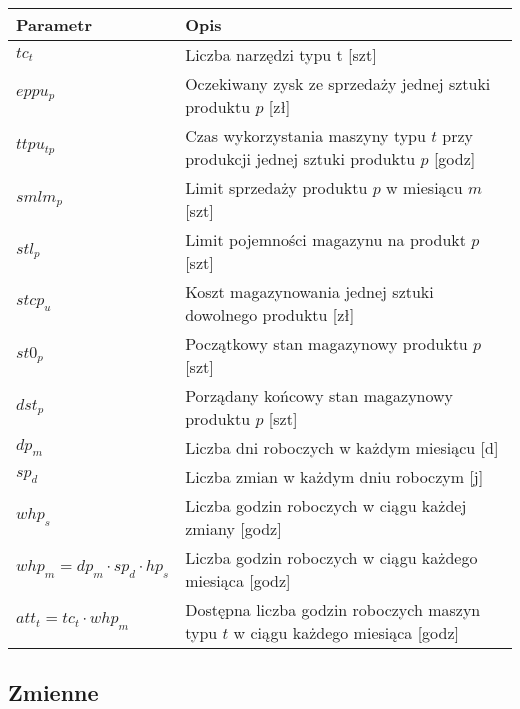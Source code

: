 \documentclass{article}
\begin{document}
\begin{table}[H]
\centering
\begin{tabular}{|l|p{10cm}|}
\hline
Parametr & Opis \\
\hline
$tc_t$ & Liczba narzędzi typu t [szt] \\
\hline
$eppu_p$ & Oczekiwany zysk ze sprzedaży jednej sztuki produktu $p$ [zł] \\
\hline
$ttpu_{tp}$ & Czas wykorzystania maszyny typu $t$ przy produkcji jednej sztuki produktu $p$ [godz] \\
\hline
$smlm_p$ & Limit sprzedaży produktu $p$ w miesiącu $m$ [szt] \\
\hline
$stl_p$ & Limit pojemności magazynu na produkt $p$ [szt] \\
\hline
$stcp_u$ & Koszt magazynowania jednej sztuki dowolnego produktu [zł] \\
\hline
$st0_p$ & Początkowy stan magazynowy produktu $p$ [szt] \\
\hline
$dst_p$ & Porządany końcowy stan magazynowy produktu $p$ [szt] \\
\hline
$dp_m$ & Liczba dni roboczych w każdym miesiącu [d] \\
\hline
$sp_d$ & Liczba zmian w każdym dniu roboczym [j] \\
\hline
$whp_s$ & Liczba godzin roboczych w ciągu każdej zmiany [godz] \\
\hline
$whp_m = dp_m \cdot sp_d \cdot hp_s$ & Liczba godzin roboczych w ciągu każdego miesiąca [godz] \\
\hline
$att_t = tc_t \cdot whp_m$ & Dostępna liczba godzin roboczych maszyn typu $t$ w ciągu każdego miesiąca [godz] \\
\hline
\end{tabular}
\end{table}

\subsection{Zmienne}
\end{document}

